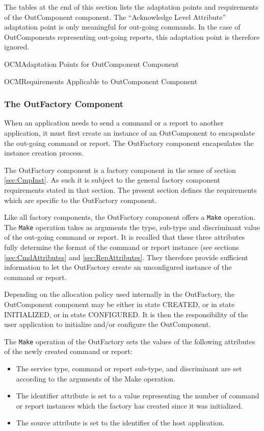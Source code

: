 \documentclass{pnp_article}
\begin{document}
The tables at the end of this section lists the adaptation points and requirements of the OutComponent component. The “Acknowledge Level Attribute” adaptation point is only meaningful for out-going commands. In the case of OutComponents representing out-going reports, this adaptation point is therefore ignored.

\begin{crAp}{OCM}{Adaptation Points for OutComponent Component}
\end{crAp}

\begin{crReq}{OCM}{Requirements Applicable to OutComponent Component}
\end{crReq}

\subsubsection{The OutFactory Component}\label{sec:OutFactory}

When an application needs to send a command or a report to another application, it must first create an instance of an OutComponent to encapsulate the out-going command or report. The OutFactory component encapsulates the instance creation process.

The OutFactory component is a factory component in the sense of section \ref{sec:CmpInst}. As such it is subject to the general factory component requirements stated in that section. The present section defines the requirements which are specific to the OutFactory component.

Like all factory components, the OutFactory component offers a \texttt{Make} operation. The \texttt{Make} operation takes as arguments the type, sub-type and discriminant value of the out-going command or report. It is recalled that these three attributes fully determine the format of the command or report instance (see sections \ref{sec:CmdAttributes} and \ref{sec:RepAttributes}. They therefore provide sufficient information to let the OutFactory create an unconfigured instance of the command or report.

Depending on the allocation policy used internally in the OutFactory, the OutComponent component may be either in state CREATED, or in state INITIALIZED, or in state CONFIGURED. It is then the responsibility of the user application to initialize and/or configure the OutComponent.

The \texttt{Make} operation of the OutFactory sets the values of the following attributes of the newly created command or report:
\begin{itemize}
\item The service type, command or report sub-type, and discriminant are set according to the arguments of the Make operation.
\item The identifier attribute is set to a value representing the number of command or report instances which the factory has created since it was initialized.
\item The source attribute is set to the identifier of the host application.
\end{itemize}
\end{document}
